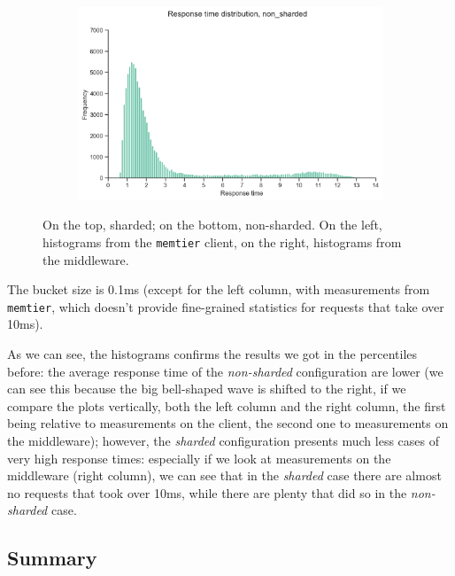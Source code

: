 \documentclass[11pt,a4paper]{article}
\renewcommand{\t}[1]{%
	{\texttt{#1}}}
\begin{document}
\begin{figure}[H]
\begin{subfigure}[b]{0.5\linewidth}
	\end{subfigure}
	\begin{subfigure}[b]{0.5\linewidth}
		\includegraphics[width=\linewidth]{images/gets_1/histogram_middleware.pdf}
	\end{subfigure}
	\caption{On the top, sharded; on the bottom, non-sharded. On the left,
		histograms from the \t{memtier} client, on the right, histograms from the
		middleware.}

	\label{fig:sharded}
\end{figure}

The bucket size is 0.1ms (except for the left column, with measurements
from \t{memtier}, which doesn't provide fine-grained statistics for 
requests that take over 10ms).

As we can see, the histograms confirms the results we got in the percentiles
before: the average response time of the \emph{non-sharded} configuration are
lower (we can see this because the big bell-shaped wave is shifted to the
right, if we compare the plots vertically, both the left column and the right
column, the first being relative to measurements on the client, the second one
to measurements on the middleware); however, the \emph{sharded} configuration
presents much less cases of very high response times: especially if we look at
measurements on the middleware (right column), we can see that in the
\emph{sharded} case there are almost no requests that took over 10ms, while
there are plenty that did so in the \emph{non-sharded} case.

\subsection{Summary}
\end{document}

